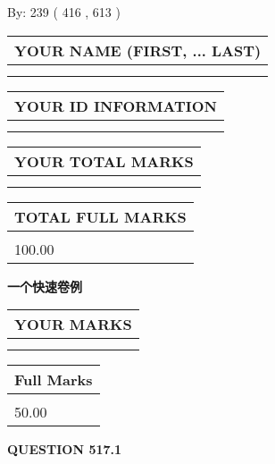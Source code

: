 \documentclass{ctexart}
\begin{document}
   
\hspace{1.0in} By: 
 239 ( 416 ,  613 )
   
   
   
   
\newpage 
\setcounter{page}{ 
   517001 } 
   
   
   
   
\noindent\begin{tabular}{|l|}
\hline
YOUR NAME (FIRST, ... LAST)  \\
\hline
 \\ 
 \\ 
\hline
\end{tabular}
\hspace{0.05in} \begin{tabular}{|l|}
\hline
 YOUR   ID   INFORMATION  \\
\hline
 \\ 
 \\ 
\hline
\end{tabular}
   
   
\vspace{0.2in}\noindent\begin{tabular}{|l|}
\hline
YOUR TOTAL MARKS  \\
\hline
 \\ 
 \\ 
\hline
\end{tabular}
\hspace{0.05in} \begin{tabular}{|l|}
\hline
TOTAL FULL MARKS  \\
\hline
 \\ 
100.00 \\
\hline
\end{tabular}
   
   
 \vspace{0.2in}
{\LARGE {\textbf{ 一个快速卷例}}}
   
   
  
\vspace{0.2in}
  
\noindent\begin{tabular}{|l|}
\hline
 YOUR MARKS  \\
\hline
 \\ 
 \\ 
\hline
\end{tabular}
\hspace{0.05in} \begin{tabular}{|l|}
\hline
 Full Marks  \\
\hline
 \\ 
50.00 \\
\hline
\end{tabular}
{\textbf{\Large{QUESTION
517.1 
}}}
  
\end{document}

